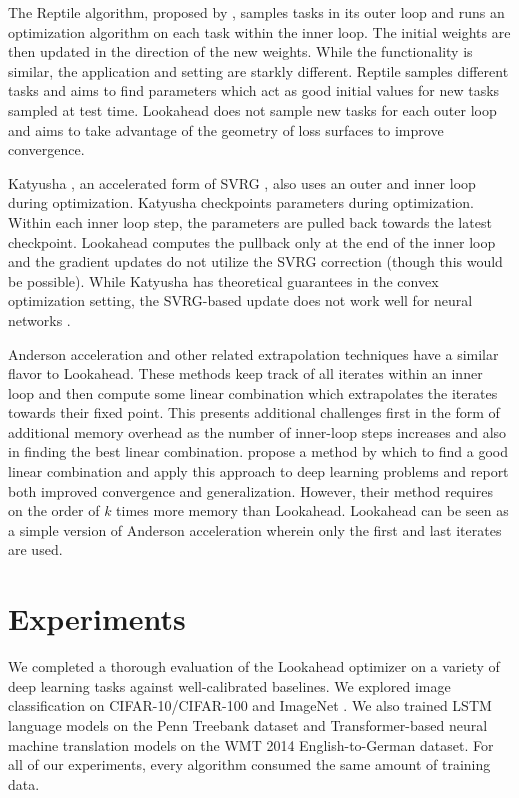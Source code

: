 \documentclass{article}
\begin{document}
The Reptile algorithm, proposed by \citet{nichol2018reptile}, samples tasks in its outer loop and runs an optimization algorithm on each task within the inner loop. The initial weights are then updated in the direction of the new weights. While the functionality is similar, the application and setting are starkly different. Reptile samples different tasks and aims to find parameters which act as good initial values for new tasks sampled at test time. Lookahead does not sample new tasks for each outer loop and aims to take advantage of the geometry of loss surfaces to improve convergence. 

Katyusha \citep{allen2017katyusha}, an accelerated form of SVRG \citep{johnson2013accelerating}, also uses an outer and inner loop during optimization. Katyusha checkpoints parameters during optimization. Within each inner loop step, the parameters are pulled back towards the latest checkpoint. Lookahead computes the pullback only at the end of the inner loop and the gradient updates do not utilize the SVRG correction (though this would be possible). While Katyusha has theoretical guarantees in the convex optimization setting, the SVRG-based update does not work well for neural networks \citep{1812.04529}. 

Anderson acceleration \citep{anderson1965iterative} and other related extrapolation techniques \citep{brezinski2013extrapolation} have a similar flavor to Lookahead. These methods keep track of all iterates within an inner loop and then compute some linear combination which extrapolates the iterates towards their fixed point. This presents additional challenges first in the form of additional memory overhead as the number of inner-loop steps increases and also in finding the best linear combination. \citet{scieur2018nonlinear, scieur2018nonlinear2} propose a  method by which to find a good linear combination and apply this approach to deep learning problems and report both improved convergence and generalization. However, their method requires on the order of $k$ times more memory than Lookahead. Lookahead can be seen as a simple version of Anderson acceleration wherein only the first and last iterates are used. 


 \section{Experiments}
\label{sec:experiments}

We completed a thorough evaluation of the Lookahead optimizer on a variety of deep learning tasks against well-calibrated baselines. We explored image classification on CIFAR-10/CIFAR-100 \citep{krizhevsky2009learning} and ImageNet \citep{deng2009imagenet}. We also trained LSTM language models on the Penn Treebank dataset \citep{marcus1993building} and Transformer-based \citep{vaswani2017attention} neural machine translation models on the WMT 2014 English-to-German dataset. For all of our experiments, every algorithm consumed the same amount of training data. 
\end{document}
